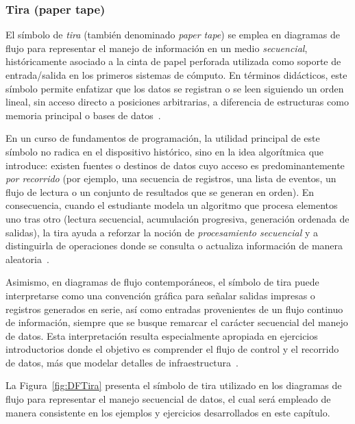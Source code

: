 \documentclass[12pt,twoside]{book}
\begin{document}
					\subsubsection{Tira (paper tape)}
						El símbolo de \emph{tira} (también denominado \emph{paper tape}) se emplea en diagramas de flujo para representar el manejo de información en un medio \emph{secuencial}, históricamente asociado a la cinta de papel perforada utilizada como soporte de entrada/salida en los primeros sistemas de cómputo. En términos didácticos, este símbolo permite enfatizar que los datos se registran o se leen siguiendo un orden lineal, sin acceso directo a posiciones arbitrarias, a diferencia de estructuras como memoria principal o bases de datos~\cite{Kelly2015Programming,Joyanes2007Fundamentos}.
						
						En un curso de fundamentos de programación, la utilidad principal de este símbolo no radica en el dispositivo histórico, sino en la idea algorítmica que introduce: existen fuentes o destinos de datos cuyo acceso es predominantemente \emph{por recorrido} (por ejemplo, una secuencia de registros, una lista de eventos, un flujo de lectura o un conjunto de resultados que se generan en orden). En consecuencia, cuando el estudiante modela un algoritmo que procesa elementos uno tras otro (lectura secuencial, acumulación progresiva, generación ordenada de salidas), la tira ayuda a reforzar la noción de \emph{procesamiento secuencial} y a distinguirla de operaciones donde se consulta o actualiza información de manera aleatoria~\cite{Kelly2015Programming,SmartDrawFlowchartSymbols}.
						
						Asimismo, en diagramas de flujo contemporáneos, el símbolo de tira puede interpretarse como una convención gráfica para señalar salidas impresas o registros generados en serie, así como entradas provenientes de un flujo continuo de información, siempre que se busque remarcar el carácter secuencial del manejo de datos. Esta interpretación resulta especialmente apropiada en ejercicios introductorios donde el objetivo es comprender el flujo de control y el recorrido de datos, más que modelar detalles de infraestructura~\cite{SmartDrawFlowchartSymbols,Joyanes2007Fundamentos}.
						
						La Figura~\ref{fig:DFTira} presenta el símbolo de tira utilizado en los diagramas de flujo para representar el manejo secuencial de datos, el cual será empleado de manera consistente en los ejemplos y ejercicios desarrollados en este capítulo.
						
\end{document}
